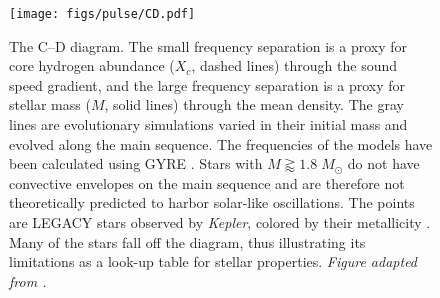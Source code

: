 \begin{figure}
    \centering
    \texttt{[image: figs/pulse/CD.pdf]}%
    \caption[C--D Diagram]{The C--D diagram. 
    The small frequency separation is a proxy for core hydrogen abundance ($X_c$, dashed lines) through the sound speed gradient, and the large frequency separation is a proxy for stellar mass ($M$, solid lines) through the mean density. 
    The gray lines are evolutionary simulations varied in their initial mass and evolved along the main sequence. 
    The frequencies of the models have been calculated using GYRE \citep{2013MNRAS.435.3406T}. 
    Stars with ${M \gtrapprox 1.8\;M_{\odot}}$ do not have convective envelopes on the main sequence and are therefore not theoretically predicted to harbor solar-like oscillations. 
    The points are LEGACY stars observed by \emph{Kepler}, colored by their metallicity \citep{2017ApJ...835..172L}. 
    Many of the stars fall off the diagram, thus illustrating its limitations as a look-up table for stellar properties. 
    \emph{Figure adapted from \citealt{2017EPJWC.16005003B}.} 
    \label{fig:jcd}} 
\end{figure}


\iffalse
From the modeling point of view, the scaling relations are used to determine $\nu_{\max}$ of a stellar model, as it cannot currently be predicted theoretically. 
We remain in want of a proper treatment of convection in stars, and so it is not currently possible to determine mode amplitudes and lifetimes. 
Following the analysis by \citet{2015A&A...583A..74J}, \citet{2017ApJ...843...11V} have recently argued that a term for the mean molecular weight $\mu$ should be added to the theoretical calculation of $\nu_{\max}$, as 
\begin{equation}
    \nu_{\max} \propto \nu_{\text{ac}} \propto g\sqrt{\frac{\mu}{T_{\text{eff}}}}%
\end{equation}
and therefore
\begin{equation}
    \frac{\nu_{\max,\ast}}{\nu_{\max,\odot}}
    =
    \left(
        \frac{M_\ast}{M_\odot}
    \right)
    \left(
        \frac{R_\ast}{R_\odot}
    \right)^{-2}
    \left(
        \frac{T_{\text{eff},\ast}}{T_{\text{eff},\odot}}
    \right)^{-\frac{1}{2}}
    \left(
        \frac{\mu_\ast}{\mu_\odot}
    \right)^{\frac{1}{2}}.
\end{equation}
\fi





